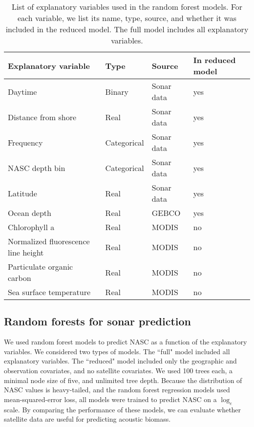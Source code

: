\documentclass[10pt,letterpaper]{article}
\begin{document}
\begin{table}
\caption{\label{tab:table1} List of explanatory variables used in the random forest models. For each variable, we list its name, type, source, and whether it was included in the reduced model. The full model includes all explanatory variables.}

\begin{tabular}{llll}
\textbf{Explanatory variable}        & \textbf{Type} & \textbf{Source} & \textbf{In reduced model} \\
\hline
Daytime                              & Binary       & Sonar data       & yes                \\
Distance from shore                  & Real         & Sonar data       & yes                \\
Frequency                           & Categorical  & Sonar data       & yes                \\
NASC depth bin                       & Categorical  & Sonar data       & yes                \\
Latitude                             & Real         & Sonar data       & yes                \\
Ocean depth                      & Real         & GEBCO            & yes                \\
Chlorophyll a                        & Real         & MODIS            & no                \\
Normalized fluorescence line height  & Real         & MODIS            & no                \\
Particulate organic carbon           & Real         & MODIS            & no                \\
Sea surface temperature              & Real         & MODIS            & no                
\end{tabular}
\end{table}

\subsection*{Random forests for sonar prediction}

We used random forest models to predict NASC as a function of the explanatory variables. 
We considered two types of models. The ``full" model included all explanatory variables. 
The ``reduced" model included only the geographic and observation covariates, and no satellite covariates. 
We used 100 trees each, a minimal node size of five, and unlimited tree depth. 
Because the distribution of NASC values is heavy-tailed, and the random forest regression models used mean-squared-error loss, all models were trained to predict NASC on a $\log_e$ scale. 
By comparing the performance of these models, we can evaluate whether satellite data are useful for predicting acoustic biomass.
\end{document}
